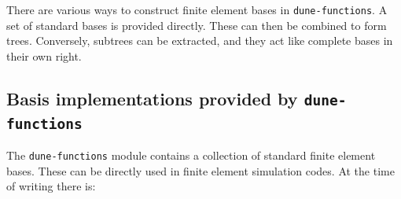 \documentclass[a4paper,10pt,headings=normal,bibliography=totoc]{scrartcl}
\newcommand{\dunemodule}[1]{\texttt{#1}}
\begin{document}
There are various ways to construct finite element bases in \dunemodule{dune-functions}.
A set of standard bases is provided directly.  These can then be combined to form trees.
Conversely, subtrees can be extracted, and they act like complete bases in their own right.

\subsection{Basis implementations provided by \texorpdfstring{\dunemodule{dune-functions}}{dune-functions}}
\label{subsec:available_bases}

The \dunemodule{dune-functions} module contains a collection of standard finite element bases.
These can be directly used in finite element simulation codes. At the time of writing there is:
\end{document}
